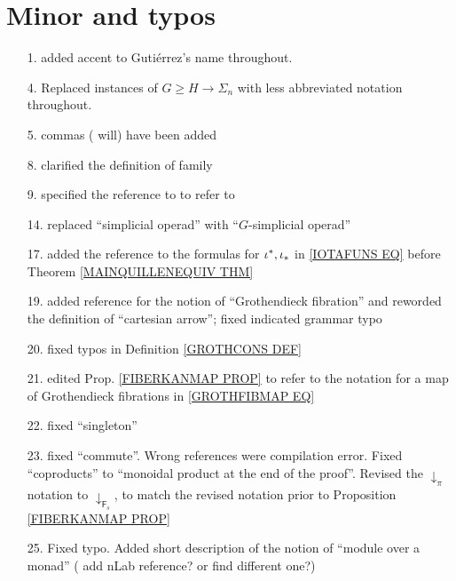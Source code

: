 \documentclass{article}
\begin{document}
\section{Minor and typos} 


\begin{itemize}
\item[1.] added accent to Guti\'{e}rrez's name throughout.

\item[4.] Replaced instances of $G \geq H \to \Sigma_n$ with less abbreviated notation throughout.

\item[5.] commas ({\color{red} will}) have been added 

\item[8.] clarified the definition of family

\item[9.] specified the reference to 
\cite{Elm83}
to refer to
\cite[\S 3]{Elm83}

\item[14.] replaced ``simplicial operad'' with  ``$G$-simplicial operad''
      
\item[17.] 
added the reference to the formulas for 
$\iota^{\**},\iota_{\**}$
in \eqref{IOTAFUNS EQ} 
before Theorem \ref{MAINQUILLENEQUIV THM}

\item[19.] added reference for the notion of ``Grothendieck fibration'' and reworded the definition of ``cartesian arrow''; fixed indicated grammar typo

\item[20.] fixed typos in Definition \ref{GROTHCONS DEF}

\item[21.] edited Prop. \ref{FIBERKANMAP PROP} to refer to the notation for a map of Grothendieck fibrations in \eqref{GROTHFIBMAP EQ}

\item[22.] fixed ``singleton''

\item[23.] fixed ``commute''. Wrong references were compilation error.
Fixed ``coproducts'' to ``monoidal product at the end of the proof''. Revised the $\downarrow_{\pi}$ notation to 
$\downarrow_{\mathsf{F}_s}$, 
to match the revised notation prior to 
Proposition \ref{FIBERKANMAP PROP}


\item[25.] Fixed typo. Added short description of the notion of ``module over a monad'' ({\color{red} add nLab reference? or find different one?})


\end{itemize}
\end{document}
